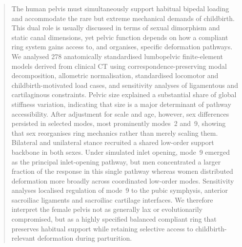 \documentclass[openacc]{rsproca_new}
\begin{document}
\begin{abstract}
The human pelvis must simultaneously support habitual bipedal loading and accommodate the rare but extreme mechanical demands of childbirth. This dual role is usually discussed in terms of sexual dimorphism and static canal dimensions, yet pelvic function depends on how a compliant ring system gains access to, and organises, specific deformation pathways. We analysed 278 anatomically standardised lumbopelvic finite-element models derived from clinical CT using correspondence-preserving modal decomposition, allometric normalisation, standardised locomotor and childbirth-motivated load cases, and sensitivity analyses of ligamentous and cartilaginous constraints. Pelvic size explained a substantial share of global stiffness variation, indicating that size is a major determinant of pathway accessibility. After adjustment for scale and age, however, sex differences persisted in selected modes, most prominently modes~2 and~9, showing that sex reorganises ring mechanics rather than merely scaling them. Bilateral and unilateral stance recruited a shared low-order support backbone in both sexes. Under simulated inlet opening, mode~9 emerged as the principal inlet-opening pathway, but men concentrated a larger fraction of the response in this single pathway whereas women distributed deformation more broadly across coordinated low-order modes. Sensitivity analyses localised regulation of mode~9 to the pubic symphysis, anterior sacroiliac ligaments and sacroiliac cartilage interfaces. We therefore interpret the female pelvis not as generally lax or evolutionarily compromised, but as a highly specified balanced compliant ring that preserves habitual support while retaining selective access to childbirth-relevant deformation during parturition.
\end{abstract}

\maketitle
\end{document}
